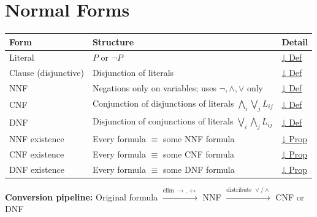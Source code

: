 
\section{Normal Forms}

\begin{tcolorbox}[colback=gray!6, colframe=gray!40, arc=2pt,
  left=6pt, right=6pt, top=4pt, bottom=4pt,
  title={\small\textbf{Normal Forms — Quick Reference}},
  fonttitle=\small\bfseries]
\small
\begin{tabular}{l l l}
\toprule
\textbf{Form} & \textbf{Structure} & \textbf{Detail} \\
\midrule
Literal      & $P$ or $\neg P$ & \hyperref[def:literal]{↓ Def} \\
Clause (disjunctive) & Disjunction of literals & \hyperref[def:clause]{↓ Def} \\
NNF          & Negations only on variables; uses $\neg,\wedge,\vee$ only & \hyperref[def:nnf]{↓ Def} \\
CNF          & Conjunction of disjunctions of literals $\bigwedge_i\bigvee_j L_{ij}$ & \hyperref[def:cnf]{↓ Def} \\
DNF          & Disjunction of conjunctions of literals $\bigvee_i\bigwedge_j L_{ij}$ & \hyperref[def:dnf]{↓ Def} \\
\midrule
NNF existence & Every formula $\equiv$ some NNF formula & \hyperref[prop:nnf-exists]{↓ Prop} \\
CNF existence & Every formula $\equiv$ some CNF formula & \hyperref[prop:cnf-exists]{↓ Prop} \\
DNF existence & Every formula $\equiv$ some DNF formula & \hyperref[prop:dnf-exists]{↓ Prop} \\
\bottomrule
\end{tabular}

\vspace{0.5em}
\textbf{Conversion pipeline:} Original formula $\xrightarrow{\text{elim } \rightarrow,\leftrightarrow}$
NNF $\xrightarrow{\text{distribute } \vee/\wedge}$ CNF or DNF
\end{tcolorbox}

\vspace{1em}

